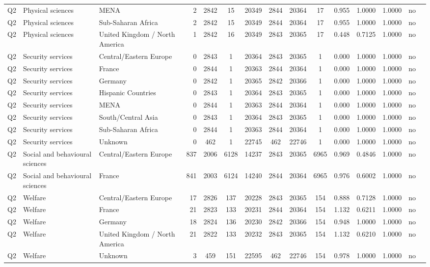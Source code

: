 \begin{longtable}{lllrcccccccccll}
Q2 & Physical sciences & MENA & 2 & 2842 & 15 & 20349 & 2844 & 20364 & 17 & 0.955 & 1.0000 & 1.0000 & no \\
Q2 & Physical sciences & Sub-Saharan Africa & 2 & 2842 & 15 & 20349 & 2844 & 20364 & 17 & 0.955 & 1.0000 & 1.0000 & no \\
Q2 & Physical sciences & United Kingdom / North America & 1 & 2842 & 16 & 20349 & 2843 & 20365 & 17 & 0.448 & 0.7125 & 1.0000 & no \\
Q2 & Security services & Central/Eastern Europe & 0 & 2843 & 1 & 20364 & 2843 & 20365 & 1 & 0.000 & 1.0000 & 1.0000 & no \\
Q2 & Security services & France & 0 & 2844 & 1 & 20363 & 2844 & 20364 & 1 & 0.000 & 1.0000 & 1.0000 & no \\
Q2 & Security services & Germany & 0 & 2842 & 1 & 20365 & 2842 & 20366 & 1 & 0.000 & 1.0000 & 1.0000 & no \\
Q2 & Security services & Hispanic Countries & 0 & 2843 & 1 & 20364 & 2843 & 20365 & 1 & 0.000 & 1.0000 & 1.0000 & no \\
Q2 & Security services & MENA & 0 & 2844 & 1 & 20363 & 2844 & 20364 & 1 & 0.000 & 1.0000 & 1.0000 & no \\
Q2 & Security services & South/Central Asia & 0 & 2843 & 1 & 20364 & 2843 & 20365 & 1 & 0.000 & 1.0000 & 1.0000 & no \\
Q2 & Security services & Sub-Saharan Africa & 0 & 2844 & 1 & 20363 & 2844 & 20364 & 1 & 0.000 & 1.0000 & 1.0000 & no \\
Q2 & Security services & Unknown & 0 & 462 & 1 & 22745 & 462 & 22746 & 1 & 0.000 & 1.0000 & 1.0000 & no \\
Q2 & Social and behavioural sciences & Central/Eastern Europe & 837 & 2006 & 6128 & 14237 & 2843 & 20365 & 6965 & 0.969 & 0.4846 & 1.0000 & no \\
Q2 & Social and behavioural sciences & France & 841 & 2003 & 6124 & 14240 & 2844 & 20364 & 6965 & 0.976 & 0.6002 & 1.0000 & no \\
Q2 & Welfare & Central/Eastern Europe & 17 & 2826 & 137 & 20228 & 2843 & 20365 & 154 & 0.888 & 0.7128 & 1.0000 & no \\
Q2 & Welfare & France & 21 & 2823 & 133 & 20231 & 2844 & 20364 & 154 & 1.132 & 0.6211 & 1.0000 & no \\
Q2 & Welfare & Germany & 18 & 2824 & 136 & 20230 & 2842 & 20366 & 154 & 0.948 & 1.0000 & 1.0000 & no \\
Q2 & Welfare & United Kingdom / North America & 21 & 2822 & 133 & 20232 & 2843 & 20365 & 154 & 1.132 & 0.6210 & 1.0000 & no \\
Q2 & Welfare & Unknown & 3 & 459 & 151 & 22595 & 462 & 22746 & 154 & 0.978 & 1.0000 & 1.0000 & no \\
\end{longtable}
